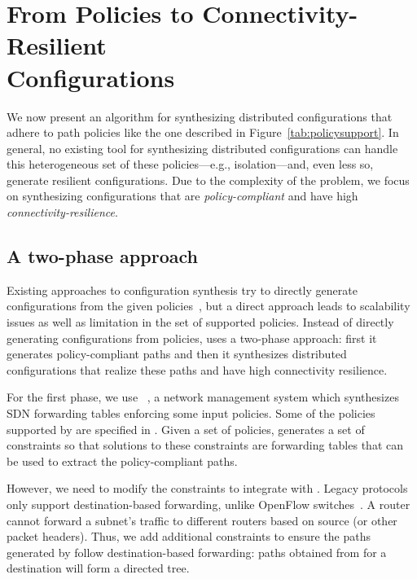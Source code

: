 \section{From Policies to Connectivity-Resilient \\ Configurations}
\label{sec:config-synthesis}

We now present an algorithm
for synthesizing distributed configurations
that adhere to path policies like the one described 
in Figure~\ref{tab:policysupport}.
In general, no existing tool for synthesizing 
distributed configurations
can handle this heterogeneous set of 
these policies---e.g., isolation---and, even less so,
generate resilient configurations.
Due to the complexity of the problem, we focus on 
synthesizing  configurations that 
are \emph{policy-compliant} and have high \emph{connectivity-resilience}.



\subsection{A two-phase approach}
Existing approaches to configuration synthesis
try to directly generate configurations from the given policies~\cite{synet},
but a direct approach leads to scalability issues as well as limitation
in the set of supported policies.
Instead of directly generating configurations from policies, 
\name uses a two-phase approach:
first it generates policy-compliant paths
and then it synthesizes distributed configurations that realize these paths
and have high connectivity resilience.

For the first phase, we use \genesis~\cite{genesis}, 
a network management system which synthesizes 
SDN forwarding tables enforcing some input policies. 
Some of the policies supported by \genesis are specified in 
. 
Given a set of policies, \genesis generates a set of constraints 
so that solutions to these constraints are forwarding
tables that can be used to extract the 
policy-compliant paths. 

However, we need to modify the \genesis constraints
to integrate with \name. Legacy protocols only
support destination-based forwarding, unlike OpenFlow switches~\cite{openflow}. 
A router cannot forward a subnet's traffic 
to different routers based on source (or other 
packet headers). Thus, we add additional constraints to ensure
the paths generated by \genesis follow destination-based 
forwarding: paths obtained from 
\genesis for a destination will form a directed tree. 

